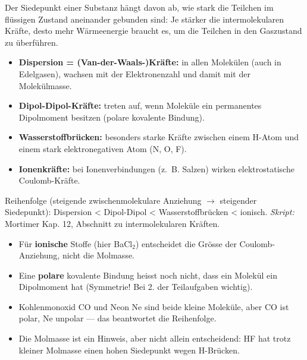 

Der Siedepunkt einer Substanz hängt davon ab, wie stark die Teilchen im
flüssigen Zustand aneinander gebunden sind: Je stärker die intermolekularen
Kräfte, desto mehr Wärmeenergie braucht es, um die Teilchen in den
Gaszustand zu überführen.

\begin{werkzeugkasten}
\begin{itemize}
  \item \textbf{Dispersion {}= (Van-der-Waals-)Kräfte:} in allen Molekülen
        (auch in Edelgasen), wachsen mit der Elektronenzahl und damit mit der
        Molekülmasse.
  \item \textbf{Dipol-Dipol-Kräfte:} treten auf, wenn Moleküle ein permanentes
        Dipolmoment besitzen (polare kovalente Bindung).
  \item \textbf{Wasserstoffbrücken:} besonders starke Kräfte zwischen einem
        H-Atom und einem stark elektronegativen Atom (N, O, F).
  \item \textbf{Ionenkräfte:} bei Ionenverbindungen (z.~B. Salzen) wirken
        elektrostatische Coulomb-Kräfte.
\end{itemize}
\medskip
Reihenfolge (steigende zwischenmolekulare Anziehung $\rightarrow$ steigender
Siedepunkt): Dispersion < Dipol-Dipol < Wasserstoffbrücken < ionisch.
\textit{Skript:} Mortimer Kap. 12, Abschnitt zu intermolekularen Kräften.
\end{werkzeugkasten}

\begin{achtung}
\begin{itemize}
  \item Für \textbf{ionische} Stoffe (hier BaCl$_2$) entscheidet die Grösse der
        Coulomb-Anziehung, nicht die Molmasse.
  \item Eine \textbf{polare} kovalente Bindung heisst noch nicht, dass ein
        Molekül ein Dipolmoment hat (Symmetrie! Bei 2. der Teilaufgaben wichtig).
  \item Kohlenmonoxid CO und Neon Ne sind beide kleine Moleküle, aber CO ist
        polar, Ne unpolar --- das beantwortet die Reihenfolge.
  \item Die Molmasse ist ein Hinweis, aber nicht allein entscheidend: HF hat
        trotz kleiner Molmasse einen hohen Siedepunkt wegen H-Brücken.
\end{itemize}
\end{achtung}

